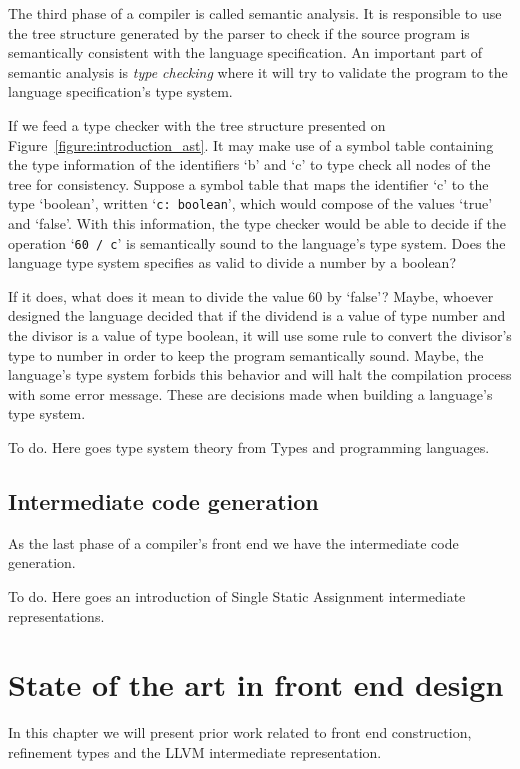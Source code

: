 \documentclass[
    oneside,
    english,
    coorientadorbanca,
    embeddedlogo,
    noabntexcite
]{ufsc-thesis-rn46-2019}
\begin{document}
The third phase of a compiler is called semantic analysis.
It is responsible to use the tree structure generated by the parser to check if the source program is semantically consistent with the language specification.
An important part of semantic analysis is \textit{type checking} where it will try to validate the program to the language specification's type system.

If we feed a type checker with the tree structure presented on Figure~\ref{figure:introduction_ast}.
It may make use of a symbol table containing the type information of the identifiers `b' and `c' to type check all nodes of the tree for consistency.
Suppose a symbol table that maps the identifier `c' to the type `boolean', written `\verb+c: boolean+', which would compose of the values `true' and `false'.
With this information, the type checker would be able to decide if the operation `\verb+60 / c+' is semantically sound to the language's type system.
Does the language type system specifies as valid to divide a number by a boolean?

If it does, what does it mean to divide the value 60 by `false'?
Maybe, whoever designed the language decided that if the dividend is a value of type number and the divisor is a value of type boolean, it will use some rule to convert the divisor's type to number in order to keep the program semantically sound.
Maybe, the language's type system forbids this behavior and will halt the compilation process with some error message.
These are decisions made when building a language's type system.

To do. Here goes type system theory from Types and programming languages.

\section{Intermediate code generation}\label{chapter:background:sec:intermediate}

As the last phase of a compiler's front end we have the intermediate code generation.

To do. Here goes an introduction of Single Static Assignment intermediate representations.

\chapter{State of the art in front end design}\label{chapter:related_work}

In this chapter we will present prior work related to front end construction, refinement types and the LLVM intermediate representation.
\end{document}
